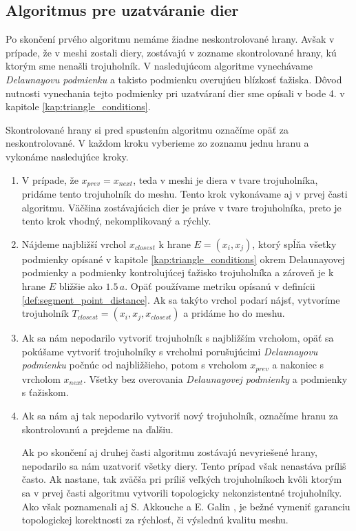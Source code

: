 \subsection{Algoritmus pre uzatváranie dier}

Po skončení prvého algoritmu nemáme žiadne neskontrolované hrany. Avšak v prípade, že v meshi zostali 
diery, zostávajú v zozname skontrolované hrany, kú ktorým sme nenašli trojuholník. V nasledujúcom 
algoritme vynechávame \textit{Delaunayovu podmienku} a takisto podmienku overujúcu blízkosť ťažiska. 
Dôvod nutnosti vynechania tejto podmienky pri uzatváraní dier sme opísali v bode 4. v kapitole 
\ref{kap:triangle_conditions}.

Skontrolované hrany si pred spustením algoritmu označíme opäť za neskontrolované. V každom kroku vyberieme
zo zoznamu jednu hranu a vykonáme nasledujúce kroky.
\begin{enumerate}
    \item{
        V prípade, že $x_{prev} = x_{next}$, teda v meshi je diera v tvare trojuholníka, pridáme tento 
        trojuholník do meshu. Tento krok vykonávame aj v prvej časti algoritmu. Väčšina zostávajúcich
        dier je práve v tvare trojuholníka, preto je tento krok vhodný, nekomplikovaný a rýchly.
    }
    \item{
        Nájdeme najbližší vrchol $x_{closest}$ k hrane $E = (x_i, x_j)$, ktorý spĺňa všetky podmienky 
        opísané v kapitole \ref{kap:triangle_conditions} okrem Delaunayovej podmienky a podmienky 
        kontrolujúcej ťažisko trojuholníka a zároveň je k hrane $E$ bližšie ako $1.5 \, a$. 
        Opäť používame metriku 
        opísanú v definícii \ref{def:segment_point_distance}. Ak sa takýto vrchol podarí nájsť, 
        vytvoríme trojuholník $T_{closest} = (x_i, x_j, x_{closest})$ a pridáme ho do meshu.
    }
    \item{
        Ak sa nám nepodarilo vytvoriť trojuholník s najbližším vrcholom, opäť sa pokúšame vytvoriť 
        trojuholníky s vrcholmi porušujúcimi \textit{Delaunayovu podmienku} počnúc od najbližšieho, 
        potom s vrcholom $x_{prev}$
        a nakoniec s vrcholom $x_{next}$. Všetky bez overovania \textit{Delaunayovej podmienky} a 
        podmienky s ťažiskom.
    }
    \item{
        Ak sa nám aj tak nepodarilo vytvoriť nový trojuholník, označíme hranu za skontrolovanú a prejdeme
        na ďalšiu.
    }
    
    Ak po skončení aj druhej časti algoritmu zostávajú nevyriešené hrany, nepodarilo sa nám 
    uzatvoriť všetky diery. Tento prípad však nenastáva príliš často. Ak nastane, tak zväčša pri 
    príliš veľkých trojuholníkoch kvôli ktorým sa v prvej časti algoritmu vytvorili topologicky
    nekonzistentné trojuholníky. Ako však poznamenali aj S. Akkouche a E. Galin 
    \cite{akkouche2001adaptive}, je bežné vymeniť garanciu topologickej korektnosti za rýchlosť,
    či výslednú kvalitu meshu. 
\end{enumerate}

